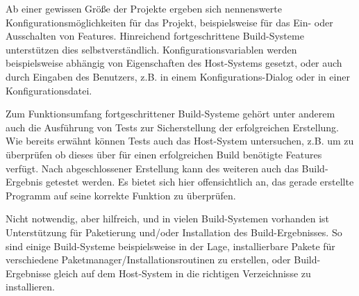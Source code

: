 Ab einer gewissen Größe der Projekte ergeben sich nennenswerte
Konfigurationsmöglichkeiten für das Projekt, beispielsweise für das Ein- oder
Ausschalten von Features. Hinreichend fortgeschrittene Build-Systeme
unterstützen dies selbstverständlich. Konfigurationsvariablen werden
beispielsweise abhängig von Eigenschaften des Host-Systems gesetzt, oder auch
durch Eingaben des Benutzers, z.B. in einem Konfigurations-Dialog oder in einer
Konfigurationsdatei.

%
Zum Funktionsumfang fortgeschrittener Build-Systeme gehört unter anderem auch
die Ausführung von Tests zur Sicherstellung der erfolgreichen Erstellung. Wie
bereits erwähnt können Tests auch das Host-System untersuchen, z.B. um zu
überprüfen ob dieses über für einen erfolgreichen Build benötigte Features
verfügt. Nach abgeschlossener Erstellung kann des weiteren auch das
Build-Ergebnis getestet werden. Es bietet sich hier offensichtlich an, das
gerade erstellte Programm auf seine korrekte Funktion zu überprüfen.

Nicht notwendig, aber hilfreich, und in vielen Build-Systemen vorhanden ist
Unterstützung für Paketierung und/oder Installation des Build-Ergebnisses. So
sind einige Build-Systeme beispielsweise in der Lage, installierbare Pakete für
verschiedene Paketmanager/Installationsroutinen zu erstellen, oder
Build-Ergebnisse gleich auf dem Host-System in die richtigen Verzeichnisse zu
installieren.
